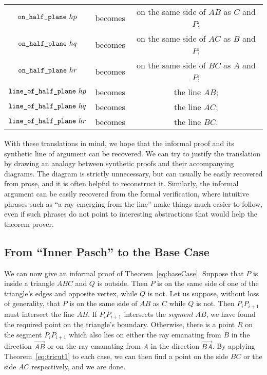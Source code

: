 \label{sec:HalfPlaneTranslations}
\begin{tabular}{ccc}
  $\texttt{on\_half\_plane}\ hp$ & becomes & on the same side of $AB$ as $C$ and $P$;\\
  $\texttt{on\_half\_plane}\ hq$ & becomes & on the same side of $AC$ as $B$ and $P$;\\
  $\texttt{on\_half\_plane}\ hr$ & becomes & on the same side of $BC$ as $A$ and $P$;\\
  $\texttt{line\_of\_half\_plane}\ hp$ & becomes & the line $AB$; \\
  $\texttt{line\_of\_half\_plane}\ hq$ & becomes & the line $AC$; \\ 
  $\texttt{line\_of\_half\_plane}\ hr$ & becomes & the line $BC$. \\
\end{tabular}

With these translations in mind, we hope that the informal proof and its synthetic line of argument can be  recovered. We can try to justify the translation by drawing an analogy between synthetic proofs and their accompanying diagrams. The diagram is strictly unnecessary, but can usually be easily recovered from prose, and it is often helpful to reconstruct it. Similarly, the informal argument can be easily recovered from the formal verification, where intuitive phrases such as ``a ray emerging from the line'' make things much easier to follow, even if such phrases do not point to interesting abstractions that would help the theorem prover.

\subsection{From ``Inner Pasch'' to the Base Case}\label{sec:JordanBaseCase1}
We can now give an informal proof of Theorem~\ref{eq:baseCase}. Suppose that $P$ is inside a triangle $ABC$ and $Q$ is outside. Then $P$ is on the same side of one of the triangle's edges and opposite vertex, while $Q$ is not. Let us suppose, without loss of generality, that $P$ is on the same side of $AB$ as $C$ while $Q$ is not. Then $P_iP_{i+1}$ must intersect the line $AB$. If $P_iP_{i+1}$ intersects the \emph{segment} $AB$, we have found the required point on the triangle's boundary. Otherwise, there is a point $R$ on the segment $P_iP_{i+1}$ which also lies on either the ray emanating from $B$ in the direction $\overrightarrow{AB}$ or on the ray emanating from $A$ in the direction $\overrightarrow{BA}$. By applying Theorem~\ref{eq:tricut1} to each case, we can then find a point on the side $BC$ or the side $AC$ respectively, and we are done.

